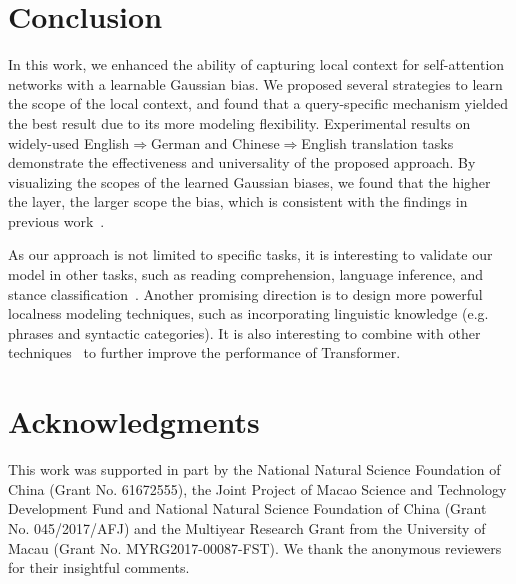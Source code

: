 \documentclass[11pt,a4paper]{article}
\begin{document}
\section{Conclusion}

In this work, we enhanced the ability of capturing local context for self-attention networks with a learnable Gaussian bias. We proposed several strategies to learn the scope of the local context, and found that a query-specific mechanism yielded the best result due to its more modeling flexibility.
Experimental results on widely-used English$\Rightarrow$German and Chinese$\Rightarrow$English translation tasks demonstrate the effectiveness and universality of the proposed approach.
By visualizing the scopes of the learned Gaussian biases, we found that the higher the layer, the larger scope the bias, which is consistent with the findings in previous work~\cite{shi2016does,Peters:2018:NAACL}.

As our approach is not limited to specific tasks, it is interesting to validate our model in other tasks, such as reading comprehension, language inference, and stance classification~\cite{Xu:2018:ACL}.
Another promising direction is to design more powerful localness modeling techniques, such as incorporating linguistic knowledge (e.g. phrases and syntactic categories).
It is also interesting to combine with other techniques~\cite{shaw2018self,Shen:2018:AAAI,Dou:2018:EMNLP,Li:2018:EMNLP} to further improve the performance of Transformer.


\section*{Acknowledgments}
This work was supported in part by the National Natural Science Foundation of China (Grant No. 61672555), the Joint Project of Macao Science and Technology Development Fund and National Natural Science Foundation of China (Grant No. 045/2017/AFJ) and the Multiyear Research Grant from the University of Macau (Grant No. MYRG2017-00087-FST).
We thank the anonymous reviewers for their insightful comments.


\balance


\end{document}
